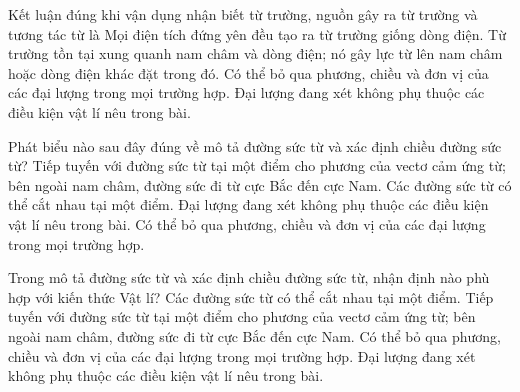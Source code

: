 \begin{ex}
Kết luận đúng khi vận dụng nhận biết từ trường, nguồn gây ra từ trường và tương tác từ là
\choice
{Mọi điện tích đứng yên đều tạo ra từ trường giống dòng điện.}
{\True Từ trường tồn tại xung quanh nam châm và dòng điện; nó gây lực từ lên nam châm hoặc dòng điện khác đặt trong đó.}
{Có thể bỏ qua phương, chiều và đơn vị của các đại lượng trong mọi trường hợp.}
{Đại lượng đang xét không phụ thuộc các điều kiện vật lí nêu trong bài.}
\end{ex}

\begin{ex}
Phát biểu nào sau đây đúng về mô tả đường sức từ và xác định chiều đường sức từ?
\choice
{\True Tiếp tuyến với đường sức từ tại một điểm cho phương của vectơ cảm ứng từ; bên ngoài nam châm, đường sức đi từ cực Bắc đến cực Nam.}
{Các đường sức từ có thể cắt nhau tại một điểm.}
{Đại lượng đang xét không phụ thuộc các điều kiện vật lí nêu trong bài.}
{Có thể bỏ qua phương, chiều và đơn vị của các đại lượng trong mọi trường hợp.}
\end{ex}

\begin{ex}
Trong mô tả đường sức từ và xác định chiều đường sức từ, nhận định nào phù hợp với kiến thức Vật lí?
\choice
{Các đường sức từ có thể cắt nhau tại một điểm.}
{\True Tiếp tuyến với đường sức từ tại một điểm cho phương của vectơ cảm ứng từ; bên ngoài nam châm, đường sức đi từ cực Bắc đến cực Nam.}
{Có thể bỏ qua phương, chiều và đơn vị của các đại lượng trong mọi trường hợp.}
{Đại lượng đang xét không phụ thuộc các điều kiện vật lí nêu trong bài.}
\end{ex}


